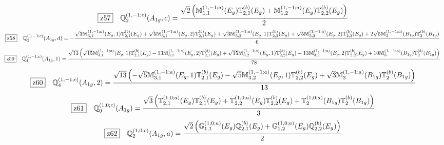 \documentclass[fleqn,10pt,landscape]{jsarticle}
\begin{document}
\begin{dmath*}
\hspace*{3mm}\fbox{z57}\quad \mathbb{Q}_{2}^{(1,-1;c)}(A_{1g},c)=\frac{\sqrt{2} \left(\mathbb{M}_{1,1}^{(1,-1;a)}(E_{g}) \mathbb{T}_{2,1}^{(b)}(E_{g}) + \mathbb{M}_{1,2}^{(1,-1;a)}(E_{g}) \mathbb{T}_{2,2}^{(b)}(E_{g})\right)}{2}
\end{dmath*}
\begin{dmath*}
\hspace*{3mm}\fbox{z58}\quad \mathbb{Q}_{2}^{(1,-1;c)}(A_{1g},d)=- \frac{\sqrt{3} \mathbb{M}_{3,1}^{(1,-1;a)}(E_{g},1) \mathbb{T}_{2,1}^{(b)}(E_{g}) + \sqrt{5} \mathbb{M}_{3,1}^{(1,-1;a)}(E_{g},2) \mathbb{T}_{2,1}^{(b)}(E_{g}) + \sqrt{3} \mathbb{M}_{3,2}^{(1,-1;a)}(E_{g},1) \mathbb{T}_{2,2}^{(b)}(E_{g}) + \sqrt{5} \mathbb{M}_{3,2}^{(1,-1;a)}(E_{g},2) \mathbb{T}_{2,2}^{(b)}(E_{g}) + 2 \sqrt{5} \mathbb{M}_{3}^{(1,-1;a)}(B_{1g}) \mathbb{T}_{2}^{(b)}(B_{1g})}{6}
\end{dmath*}
\begin{dmath*}
\hspace*{3mm}\fbox{z59}\quad \mathbb{Q}_{4}^{(1,-1;c)}(A_{1g},1)=\frac{\sqrt{13} \left(\sqrt{15} \mathbb{M}_{3,1}^{(1,-1;a)}(E_{g},1) \mathbb{T}_{2,1}^{(b)}(E_{g}) - 13 \mathbb{M}_{3,1}^{(1,-1;a)}(E_{g},2) \mathbb{T}_{2,1}^{(b)}(E_{g}) + \sqrt{15} \mathbb{M}_{3,2}^{(1,-1;a)}(E_{g},1) \mathbb{T}_{2,2}^{(b)}(E_{g}) - 13 \mathbb{M}_{3,2}^{(1,-1;a)}(E_{g},2) \mathbb{T}_{2,2}^{(b)}(E_{g}) + 10 \mathbb{M}_{3}^{(1,-1;a)}(B_{1g}) \mathbb{T}_{2}^{(b)}(B_{1g})\right)}{78}
\end{dmath*}
\begin{dmath*}
\hspace*{3mm}\fbox{z60}\quad \mathbb{Q}_{4}^{(1,-1;c)}(A_{1g},2)=\frac{\sqrt{13} \left(- \sqrt{5} \mathbb{M}_{3,1}^{(1,-1;a)}(E_{g},1) \mathbb{T}_{2,1}^{(b)}(E_{g}) - \sqrt{5} \mathbb{M}_{3,2}^{(1,-1;a)}(E_{g},1) \mathbb{T}_{2,2}^{(b)}(E_{g}) + \sqrt{3} \mathbb{M}_{3}^{(1,-1;a)}(B_{1g}) \mathbb{T}_{2}^{(b)}(B_{1g})\right)}{13}
\end{dmath*}
\begin{dmath*}
\hspace*{3mm}\fbox{z61}\quad \mathbb{Q}_{0}^{(1,0;c)}(A_{1g})=\frac{\sqrt{3} \left(\mathbb{T}_{2,1}^{(1,0;a)}(E_{g}) \mathbb{T}_{2,1}^{(b)}(E_{g}) + \mathbb{T}_{2,2}^{(1,0;a)}(E_{g}) \mathbb{T}_{2,2}^{(b)}(E_{g}) + \mathbb{T}_{2}^{(1,0;a)}(B_{1g}) \mathbb{T}_{2}^{(b)}(B_{1g})\right)}{3}
\end{dmath*}
\begin{dmath*}
\hspace*{3mm}\fbox{z62}\quad \mathbb{Q}_{2}^{(1,0;c)}(A_{1g},a)=\frac{\sqrt{2} \left(\mathbb{G}_{1,1}^{(1,0;a)}(E_{g}) \mathbb{Q}_{2,1}^{(b)}(E_{g}) + \mathbb{G}_{1,2}^{(1,0;a)}(E_{g}) \mathbb{Q}_{2,2}^{(b)}(E_{g})\right)}{2}
\end{dmath*}
\end{document}

